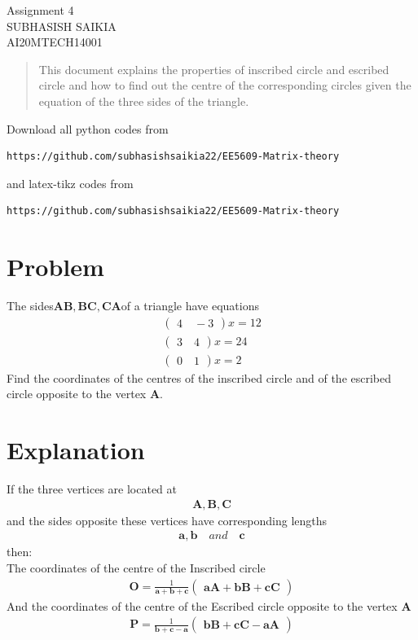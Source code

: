 \documentclass[journal,12pt,twocolumn]{IEEEtran}
\newcommand{\myvec}[1]{\ensuremath{\begin{pmatrix}#1\end{pmatrix}}}
\numberwithin{equation}{subsection}
\let\vec\mathbf
\begin{document}
\begin{center}
\huge Assignment 4\\
\large SUBHASISH SAIKIA\\
\large AI20MTECH14001\\
\end{center}
\vspace{0.5cm}
\begin{abstract}
This document explains the properties of inscribed circle and  escribed circle and how to find out the centre of the corresponding circles given the equation of the three sides of the triangle. 
\end{abstract}
\vspace{0.5cm}
Download all python codes from 
\begin{lstlisting}
https://github.com/subhasishsaikia22/EE5609-Matrix-theory
\end{lstlisting}
%
and latex-tikz codes from 
\begin{lstlisting}
https://github.com/subhasishsaikia22/EE5609-Matrix-theory
\end{lstlisting}
%
\vspace{0.5cm}
\section{Problem}
The sides$ \vec{AB},\vec{BC}, \vec{CA} $of a triangle have equations
\begin{align}
    \myvec{4\quad-3}x=12\\
    \myvec{3\quad4}x=24 \\ 
    \myvec{0\quad1}x=2
\end{align} 
Find the coordinates of the centres of the
inscribed circle and of the escribed circle opposite
to the vertex $\vec{A}$.

\section{Explanation}

If the three vertices are located at\begin{align}
     \vec{A},\vec{B},\vec{C}
\end{align} 
and the sides opposite these vertices have corresponding lengths \begin{align}
\vec{a}, \vec{b} \quad and \quad\vec{c} 
\end{align} 
then:\\
 The coordinates of the centre of the Inscribed circle
 \begin{align}
 \vec{O}=\frac{1}{\vec{a}+\vec{b}+\vec{c}}\myvec{\vec{a}\vec{A}+\vec{b} \vec{B}+\vec{c}\vec{C}}
 \end{align} 
And the coordinates of the centre of the Escribed circle  opposite to the vertex $\vec{A}$
 \begin{align}
\vec{P}=\frac{1}{\vec{b}+\vec{c}-\vec{a}}\myvec{ \vec{b}\vec{B}+\vec{c}\vec{C}-\vec{a}\vec{A}}
 \end{align}
 
\end{document}

